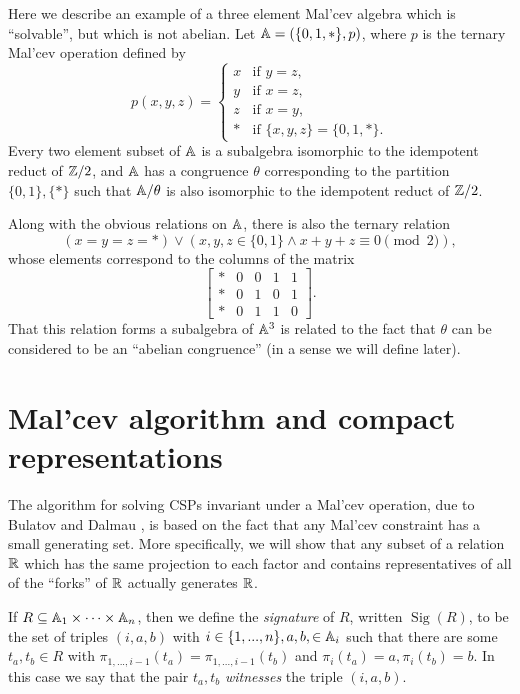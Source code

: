 \documentclass[letterpaper,11pt]{article}
\begin{document}
\begin{ex}\label{ex-solvable-nonab-malcev} Here we describe an example of a three element Mal'cev algebra which is ``solvable'', but which is not abelian. Let $\mathbb{A} = (\{0,1,*\}, p)$, where $p$ is the ternary Mal'cev operation defined by
\[
p(x,y,z) = \begin{cases}x & \text{if }y=z,\\ y & \text{if }x=z,\\ z & \text{if } x=y,\\ * & \text{if } \{x,y,z\} = \{0,1,*\}.\end{cases}
\]
Every two element subset of $\mathbb{A}$ is a subalgebra isomorphic to the idempotent reduct of $\mathbb{Z}/2$, and $\mathbb{A}$ has a congruence $\theta$ corresponding to the partition $\{0,1\}, \{*\}$ such that $\mathbb{A}/\theta$ is also isomorphic to the idempotent reduct of $\mathbb{Z}/2$.

Along with the obvious relations on $\mathbb{A}$, there is also the ternary relation
\[
(x = y = z = *) \vee (x,y,z \in \{0,1\} \wedge x+y+z \equiv 0\!\!\!\pmod{2}),
\]
whose elements correspond to the columns of the matrix
\[
\begin{bmatrix} * & 0 & 0 & 1 & 1\\ * & 0 & 1 & 0 & 1\\ * & 0 & 1 & 1 & 0\end{bmatrix}.
\]
That this relation forms a subalgebra of $\mathbb{A}^3$ is related to the fact that $\theta$ can be considered to be an ``abelian congruence'' (in a sense we will define later).
\end{ex}


\section{Mal'cev algorithm and compact representations}

The algorithm for solving CSPs invariant under a Mal'cev operation, due to Bulatov and Dalmau \cite{bulatov-dalmau-malcev}, is based on the fact that any Mal'cev constraint has a small generating set. More specifically, we will show that any subset of a relation $\mathbb{R}$ which has the same projection to each factor and contains representatives of all of the ``forks'' of $\mathbb{R}$ actually generates $\mathbb{R}$.

\begin{defn} If $R \subseteq \mathbb{A}_1 \times \cdots \times \mathbb{A}_n$, then we define the \emph{signature} of $R$, written $\operatorname{Sig}(R)$, to be the set of triples $(i,a,b)$ with $i \in \{1, ..., n\}, a,b, \in \mathbb{A}_i$ such that there are some $t_a,t_b \in R$ with $\pi_{1, ..., i-1}(t_a) = \pi_{1, ..., i-1}(t_b)$ and $\pi_i(t_a) = a, \pi_i(t_b) = b$. In this case we say that the pair $t_a,t_b$ \emph{witnesses} the triple $(i,a,b)$.
\end{defn}
\end{document}
